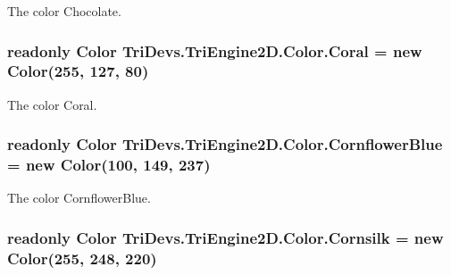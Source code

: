 The color Chocolate. 

\hypertarget{struct_tri_devs_1_1_tri_engine2_d_1_1_color_ae9b0dca0da12afa288c2197c39dc57a7}{
\subsubsection[{Coral}]{\setlength{\rightskip}{0pt plus 5cm}readonly {\bf Color} Tri\-Devs.\-Tri\-Engine2\-D.\-Color.\-Coral = new {\bf Color}(255, 127, 80)\hspace{0.3cm}{\ttfamily [static]}}}\label{struct_tri_devs_1_1_tri_engine2_d_1_1_color_ae9b0dca0da12afa288c2197c39dc57a7}


The color Coral. 

\hypertarget{struct_tri_devs_1_1_tri_engine2_d_1_1_color_a2b092fb5f96859e8b44b9cfbe3bd08f6}{
\subsubsection[{Cornflower\-Blue}]{\setlength{\rightskip}{0pt plus 5cm}readonly {\bf Color} Tri\-Devs.\-Tri\-Engine2\-D.\-Color.\-Cornflower\-Blue = new {\bf Color}(100, 149, 237)\hspace{0.3cm}{\ttfamily [static]}}}\label{struct_tri_devs_1_1_tri_engine2_d_1_1_color_a2b092fb5f96859e8b44b9cfbe3bd08f6}


The color Cornflower\-Blue. 

\hypertarget{struct_tri_devs_1_1_tri_engine2_d_1_1_color_a1985da695d991f06b20d1478627be0da}{
\subsubsection[{Cornsilk}]{\setlength{\rightskip}{0pt plus 5cm}readonly {\bf Color} Tri\-Devs.\-Tri\-Engine2\-D.\-Color.\-Cornsilk = new {\bf Color}(255, 248, 220)\hspace{0.3cm}{\ttfamily [static]}}}\label{struct_tri_devs_1_1_tri_engine2_d_1_1_color_a1985da695d991f06b20d1478627be0da}


